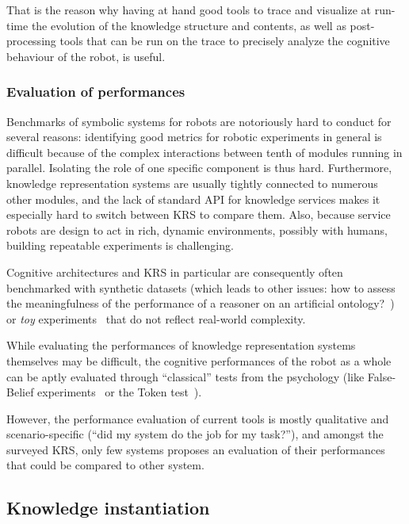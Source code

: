 \documentclass[a4paper, twocolumn]{article}
\begin{document}
That is the reason why having at hand good tools to trace and visualize at
run-time the evolution of the knowledge structure and contents, as well as
post-processing tools that can be run on the trace to precisely analyze the
cognitive behaviour of the robot, is useful.

\subsubsection{Evaluation of performances}
\label{sect|performances}

Benchmarks of symbolic systems for robots are notoriously hard to conduct for
several reasons: identifying good metrics for robotic experiments in general is
difficult because of the complex interactions between tenth of modules running
in parallel. Isolating the role of one specific component is thus hard.
Furthermore, knowledge representation systems are usually tightly connected to
numerous other modules, and the lack of standard API for knowledge services
makes it especially hard to switch between KRS to compare them. Also, because
service robots are design to act in rich, dynamic environments, possibly with
humans, building repeatable experiments is challenging.

Cognitive architectures and KRS in particular are consequently often
benchmarked with synthetic datasets (which leads to other issues: how to assess
the meaningfulness of the performance of a reasoner on an artificial
ontology?~\cite{Bail2010}) or \emph{toy} experiments~\cite{Chong2009} that do
not reflect real-world complexity.

While evaluating the performances of knowledge representation systems
themselves may be difficult, the cognitive performances of the robot as a whole
can be aptly evaluated through ``classical'' tests from the psychology (like
False-Belief experiments~\cite{Leslie2000} or the Token
test~\cite{DiSimoni1978}).

However, the performance evaluation of current tools is mostly qualitative and
scenario-specific (``did my system do the job for my task?''), and amongst the
surveyed KRS, only few systems proposes an evaluation of their performances
that could be compared to other system.

\subsection{Knowledge instantiation}
\end{document}

